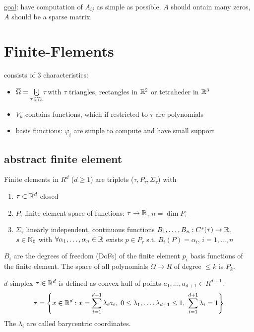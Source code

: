 \underline{goal}: have computation of $A_{ij}$ as simple as possible. $A$ should ontain many zeros, $A$ should be a sparse matrix.

\section{Finite-Flements}
consists of 3 characteristics:
\begin{itemize}
	\item $\overline{\Omega}= \underset{\tau \in \T_h}{\bigcupdot} \tau$\quad  with $\tau$ triangles, rectangles in $\mathbb{R}^2$ or tetraheder in $\mathbb{R}^3$
	

%
	
	\item $V_h$ contains functions, which if restricted to $\tau$ are polynomials
	\item basis functions: $\varphi_i$ are simple to compute and have small support
\end{itemize}
\subsection{abstract finite element}
\begin{definition_}
	Finite elements in $R^d$ ($d\geq 1$) are triplets ($\tau,P_{\tau},\Sigma_{\tau}$) with 
	\begin{enumerate}[label=(\roman*)]
		\item $\tau \subset \mathbb{R}^d$ closed
		\item $P_{\tau}$ finite element space of functions: $\tau \to \mathbb{R}$, $n = \dim P_{\tau}$
		\item $\Sigma_{\tau}$ linearly independent, continuous functions $B_1,\dots,B_n:C^s(\tau) \to \mathbb{R}$, $s \in \mathbb{N}_0$ with $\forall \alpha_1, \dots, \alpha_n \in \mathbb{R}$ exists $p \in P_{\tau}$ s.t. $B_i (P) = \alpha_i$, $i = 1, \dots,n$
	\end{enumerate}
\end{definition_}
$B_i$ are the degrees of freedom (DoFs) of the finite element $p_i$ basis functions of the finite element. The space of all polynomials $\Omega \to R$ of degree $\leq k$ is $P_k$.

$d$-simplex $\tau \in \mathbb{R}^d$ is defined as convex hull of points $a_1,\dots,a_{d+1}\in R^{d+1}$.
\begin{equation*}
	\tau = \left\{ x\in \mathbb{R}^d: x= \displaystyle \sum^{d+1}_{i=1} \lambda_ia_i,\ 0 \leq \lambda_1, \dots,\lambda_{d+1}\leq 1,\ \displaystyle \sum^{d+1}_{i=1} \lambda_i =1\right\}
\end{equation*}
The $\lambda_i$ are called \glqq barycentric coordinates\grqq.


